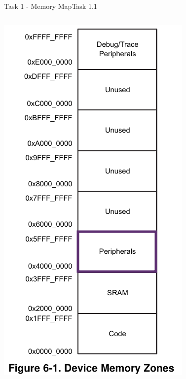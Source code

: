 \begin{frame}{Task 1 - Memory Map}{Task 1.1}
  \begin{solution}
    \begin{columns}
      \begin{column}{0.4\textwidth}
        \includegraphics[height=0.5\paperheight]{./figures/peripherals.png}

\end{column}
\end{columns}
\end{solution}
\end{frame}
